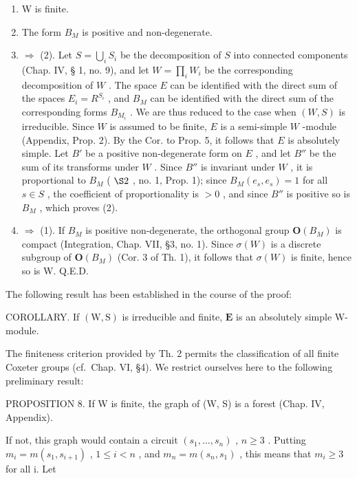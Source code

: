 \begin{enumerate}
\def\labelenumi{(\arabic{enumi})}
\item
  W is finite.
\item
  The form \(B_{M}\) is positive and non-degenerate.
\item
  \(\Longrightarrow\) (2). Let \(S = \bigcup_{i} S_{i}\) be the decomposition of \(S\) into connected components (Chap. IV, § 1, no. 9), and let \(W = \prod_{i} W_{i}\) be the corresponding decomposition of \(W\) . The space \(E\) can be identified with the direct sum of the spaces \(E_{i} = R^{S_{i}}\) , and \(B_{M}\) can be identified with the direct sum of the corresponding forms \(B_{M_{i}}\) . We are thus reduced to the case when \((W, S)\) is irreducible. Since \(W\) is assumed to be finite, \(E\) is a semi-simple \(W\) -module (Appendix, Prop. 2). By the Cor. to Prop. 5, it follows that \(E\) is absolutely simple. Let \(B'\) be a positive non-degenerate form on \(E\) , and let \(B''\) be the sum of its transforms under \(W\) . Since \(B''\) is invariant under \(W\) , it is proportional to \(B_{M}\) ( \(\S 2\) , no. 1, Prop. 1); since \(B_{M}(e_{s}, e_{s}) = 1\) for all \(s \in S\) , the coefficient of proportionality is \(>0\) , and since \(B''\) is positive so is \(B_{M}\) , which proves (2).
\item
  \(\Longrightarrow\) (1). If \(B_{M}\) is positive non-degenerate, the orthogonal group \(\mathbf{O}(B_{M})\) is compact (Integration, Chap. VII, §3, no. 1). Since \(\sigma(W)\) is a discrete subgroup of \(\mathbf{O}(B_{M})\) (Cor. 3 of Th. 1), it follows that \(\sigma(W)\) is finite, hence so is W. Q.E.D.
\end{enumerate}

The following result has been established in the course of the proof:

COROLLARY. If \((\mathrm{W},\mathrm{S})\) is irreducible and finite, \(\mathbf{E}\) is an absolutely simple W-module.

The finiteness criterion provided by Th. 2 permits the classification of all finite Coxeter groups (cf.~Chap. VI, §4). We restrict ourselves here to the following preliminary result:

PROPOSITION 8. If W is finite, the graph of (W, S) is a forest (Chap. IV, Appendix).

If not, this graph would contain a circuit \((s_{1},\ldots,s_{n})\) , \(n\geqslant3\) . Putting \(m_{i}=m(s_{1},s_{i+1})\) , \(1\leqslant i<n\) , and \(m_{n}=m(s_{n},s_{1})\) , this means that \(m_{i}\geqslant3\) for all i. Let

